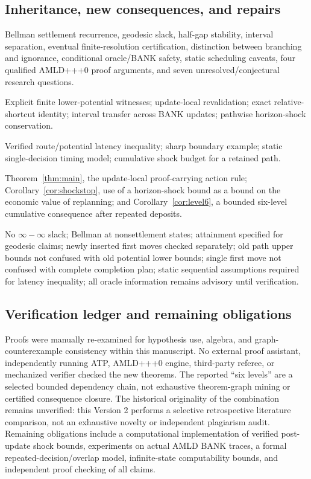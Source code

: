 \documentclass[11pt]{article}
\theoremstyle{definition}\newtheorem{definition}[theorem]{Definition}\newtheorem{assumption}[theorem]{Assumption}
\theoremstyle{remark}\newtheorem{remark}[theorem]{Remark}
\begin{document}
\subsection*{Inheritance, new consequences, and repairs}
\begin{description}[style=nextline,leftmargin=1.8cm,itemsep=3pt]
\item[$W_0$ inherited.] Bellman settlement recurrence, geodesic slack, half-gap stability, interval separation, eventual finite-resolution certification, distinction between branching and ignorance, conditional oracle/BANK safety, static scheduling caveats, four qualified AMLD+++0 proof arguments, and seven unresolved/conjectural research questions.
\item[A-line additions.] Explicit finite lower-potential witnesses; update-local revalidation; exact relative-shortcut identity; interval transfer across BANK updates; pathwise horizon-shock conservation.
\item[B-line additions.] Verified route/potential latency inequality; sharp boundary example; static single-decision timing model; cumulative shock budget for a retained path.
\item[New cross-line consequences.] Theorem~\ref{thm:main}, the update-local proof-carrying action rule; Corollary~\ref{cor:shockstop}, use of a horizon-shock bound as a bound on the economic value of replanning; and Corollary~\ref{cor:level6}, a bounded six-level cumulative consequence after repeated deposits.
\item[Repaired defects and qualifications.] No $\infty-\infty$ slack; Bellman at nonsettlement states; attainment specified for geodesic claims; newly inserted first moves checked separately; old path upper bounds not confused with old potential lower bounds; single first move not confused with complete completion plan; static sequential assumptions required for latency inequality; all oracle information remains advisory until verification.
\end{description}
\subsection*{Verification ledger and remaining obligations}
Proofs were manually re-examined for hypothesis use, algebra, and graph-counterexample consistency within this manuscript. No external proof assistant, independently running ATP, AMLD+++0 engine, third-party referee, or mechanized verifier checked the new theorems. The reported ``six levels'' are a selected bounded dependency chain, not exhaustive theorem-graph mining or certified consequence closure. The historical originality of the combination remains unverified: this Version 2 performs a selective retrospective literature comparison, not an exhaustive novelty or independent plagiarism audit. Remaining obligations include a computational implementation of verified post-update shock bounds, experiments on actual AMLD BANK traces, a formal repeated-decision/overlap model, infinite-state computability bounds, and independent proof checking of all claims.
\end{document}

